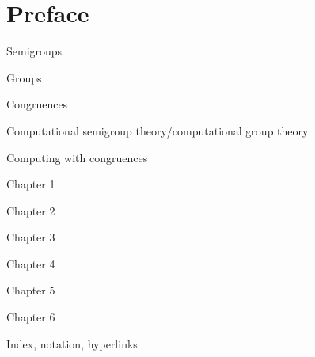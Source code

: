 \chapter*{Preface}

Semigroups

Groups

Congruences

Computational semigroup theory/computational group theory

Computing with congruences

Chapter 1

Chapter 2

Chapter 3

Chapter 4

Chapter 5

Chapter 6

Index, notation, hyperlinks

